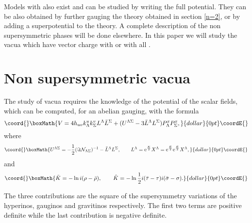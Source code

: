 \documentclass[a4paper,12pt]{article}
\begin{document}
Models with \coordHE{} also exist and can be studied by writing the
full \coordHE{} potential. They can be also obtained by further gauging
the \coordHE{} theory obtained  in section \ref{n=2},  or by adding a
superpotential to the \coordHE{} theory. A complete description of the
non supersymmetric phases will be done elsewhere. In this paper we
will study the \coordHE{} vacua which have vector charge with \coordHE{} or with all \coordHE{}.






\section{Non supersymmetric vacua}
The study of \coordHE{} vacua requires the knowledge of the potential
of the scalar fields, which can be computed, for an abelian
gauging, with the formula \cite{abcdffm}
$$\coord{}\boxMath{V=4h_{uv}k^u_\Lambda k^v_\Sigma L^\Lambda\bar L^\Sigma+
(U^{\Lambda\Sigma}-3\bar L^\Lambda
L^\Sigma)P_\Lambda^xP_\Sigma^x,}{dollar}{0pt}\coordE{}$$ where
$$\coord{}\boxMath{U^{\Lambda\Sigma}=-\frac 1 2
(\Im\mathcal{N}_{\Lambda\Sigma})^{-1}-\bar L^\Lambda L^\Sigma,
\qquad L^\Lambda=\mathrm{e}^{\frac K 2}X^\Lambda=
\mathrm{e}^{\frac{\tilde K} 2}\mathrm{e}^{\frac {\hat K}
2}X^\Lambda,}{dollar}{0pt}\coordE{}$$ and
$$\coord{}\boxMath{\tilde K=-\ln i(\rho-\bar\rho), \qquad \hat K=-\ln\frac 12i(\bar \tau-\tau)i(\bar \sigma-\sigma).}{dollar}{0pt}\coordE{}$$



The three contributions are the square of the supersymmetry
variations of the hyperinos, gauginos and gravitinos respectively.
The first two terms are positive definite while the last
contribution is negative definite.
\end{document}
